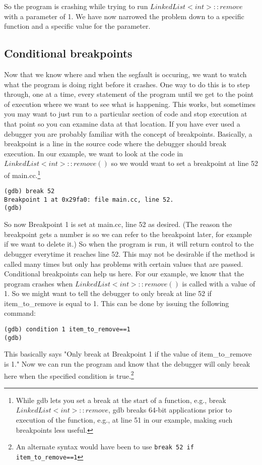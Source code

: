 So the program is crashing while trying to run $LinkedList<int>::remove$ with a parameter of 1. We have now narrowed the problem down to a specific function and a specific value for the parameter.

\subsection{Conditional breakpoints}
Now that we know where and when the segfault is occuring, we want to watch what the program is doing right before it crashes. One way to do this is to step through, one at a time, every statement of the program until we get to the point of execution where we want to see what is happening. This works, but sometimes you may want to just run to a particular section of code and stop execution at that point so you can examine data at that location.
If you have ever used a debugger you are probably familiar with the concept of breakpoints. Basically, a breakpoint is a line in the source code where the debugger should break execution. In our example, we want to look at the code in $LinkedList<int>::remove()$ so we would want to set a breakpoint at line 52 of main.cc.\footnote{While gdb lets you set a break at the start of a function, e.g., break $LinkedList<int>::remove$, gdb breaks 64-bit applications
prior to execution of the function, e.g., at line 51 in our example, making such breakpoints less useful.}

\begin{verbatim}
(gdb) break 52
Breakpoint 1 at 0x29fa0: file main.cc, line 52.
(gdb)
\end{verbatim}
So now Breakpoint 1 is set at main.cc, line 52 as desired. (The reason the breakpoint gets a number is so we can refer to the breakpoint later, for example if we want to delete it.) So when the program is run, it will return control to the debugger everytime it reaches line 52. This may not be desirable if the method is called many times but only has problems with certain values that are passed. Conditional breakpoints can help us here. For our example, we know that the program crashes when $LinkedList<int>::remove()$ is called with a value of 1. So we might want to tell the debugger to only break at line 52 if item\_to\_remove is equal to 1. This can be done by issuing the following command:
\begin{verbatim}
(gdb) condition 1 item_to_remove==1
(gdb)
\end{verbatim}
This basically says "Only break at Breakpoint 1 if the value of item\_to\_remove is 1." Now we can run the program and know that the debugger will only break here when the specified condition is true.\footnote{An alternate syntax would have been to use {\tt break 52 if item\_to\_remove==1}}

